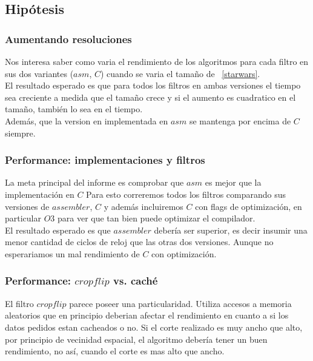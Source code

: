 \pagebreak

\subsection{Hipótesis}


\subsubsection{Aumentando resoluciones}

Nos interesa saber como varia el rendimiento de los algoritmos para cada filtro en sus dos variantes ($asm$, $C$) cuando se varia el tamaño de ~\ref{starwars}.\\

El resultado esperado es que para todos los filtros en ambas versiones el tiempo sea creciente a medida que el tamaño crece y si el aumento es cuadratico en el tamaño, también lo sea en el tiempo. \\
Además, que la version en implementada en $asm$ se mantenga por encima de $C$ siempre. \\ 



\subsubsection{Performance: implementaciones y filtros}

La meta principal del informe es comprobar que $asm$ es mejor que la implementación en $C$
Para esto correremos todos los filtros comparando sus versiones de $assembler$, $C$ y además incluiremos $C$ con flags de optimización, en particular $O3$ para ver que tan bien puede optimizar el compilador. \\

El resultado esperado es que $assembler$ debería ser superior, es decir insumir una menor cantidad de ciclos de reloj que las otras dos versiones. Aunque no esperariamos un mal rendimiento de $C$ con optimización. \\



\subsubsection{Performance: $cropflip$ vs. caché}

El filtro $cropflip$ parece poseer una particularidad. Utiliza accesos a memoria aleatorios que en principio deberian afectar el rendimiento en cuanto a si los datos pedidos estan cacheados o no. 
Si el corte realizado es muy ancho que alto, por principio de vecinidad espacial, el algoritmo debería tener un buen rendimiento, no así, cuando el corte es mas alto que ancho. \\


